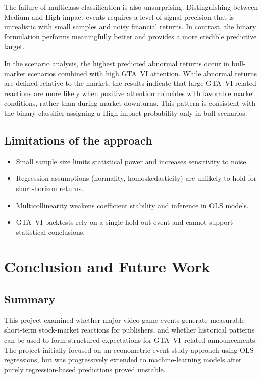 \documentclass[11pt,a4paper]{article}
\begin{document}
The failure of multiclass classification is also unsurprising. Distinguishing between Medium and High impact events requires a level of signal precision that is unrealistic with small samples and noisy financial returns. In contrast, the binary formulation performs meaningfully better and provides a more credible predictive target.

In the scenario analysis, the highest predicted abnormal returns occur in bull-market scenarios combined with high GTA~VI attention. While abnormal returns are defined relative to the market, the results indicate that large GTA~VI-related reactions are more likely when positive attention coincides with favorable market conditions, rather than during market downturns. This pattern is consistent with the binary classifier assigning a High-impact probability only in bull scenarios.

\subsection{Limitations of the approach}

\begin{itemize}[itemsep=2pt]
    \item Small sample size limits statistical power and increases sensitivity to noise.
    \item Regression assumptions (normality, homoskedasticity) are unlikely to hold for short-horizon returns.
    \item Multicollinearity weakens coefficient stability and inference in OLS models.
    \item GTA~VI backtests rely on a single hold-out event and cannot support statistical conclusions.
\end{itemize}

\section{Conclusion and Future Work}
\label{sec:conclusion}

\subsection{Summary}

This project examined whether major video-game events generate measurable short-term stock-market reactions for publishers, and whether historical patterns can be used to form structured expectations for GTA~VI--related announcements. The project initially focused on an econometric event-study approach using OLS regressions, but was progressively extended to machine-learning models after purely regression-based predictions proved unstable.
\end{document}

